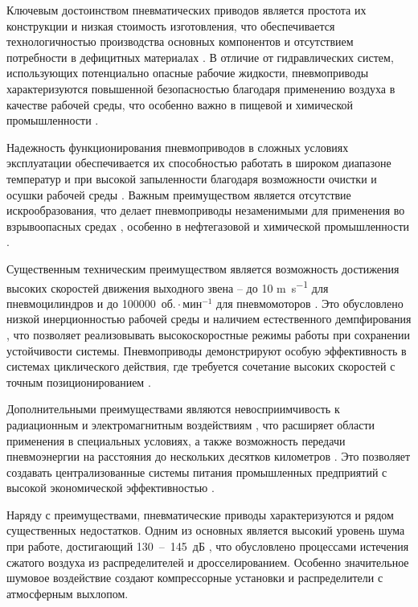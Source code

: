 Ключевым достоинством пневматических приводов является простота их конструкции и низкая
стоимость изготовления, что обеспечивается технологичностью производства основных компонентов
и отсутствием потребности в дефицитных материалах \cite{ritter2009nonlinear,dong2003prospects}. В отличие от гидравлических систем, использующих потенциально
опасные рабочие жидкости, пневмоприводы характеризуются повышенной безопасностью благодаря применению воздуха в качестве рабочей среды, что особенно важно в
пищевой и химической промышленности \cite{raisoni2017utilization,kreinin2020optimization}.

Надежность функционирования пневмоприводов в сложных условиях эксплуатации обеспечивается их способностью работать
в широком диапазоне температур и при высокой запыленности благодаря возможности очистки и осушки рабочей среды
\cite{perez2021reliable,lin2020selfsensing,robertson2017soft}. Важным преимуществом является отсутствие искрообразования,
что делает пневмоприводы незаменимыми для применения во взрывоопасных средах \cite{dong2003prospects,khitrovo2022jet},
особенно в нефтегазовой и химической промышленности \cite{li2008piezoelectric,zhao2017design}.

Существенным техническим преимуществом является возможность достижения высоких скоростей движения выходного
звена -- до 10 \si{\metre\per\second} для пневмоцилиндров и до \num{100000}~$\text{об.}\cdot\text{мин}^{-1}$ для пневмомоторов
\cite{tanaka2013comparative,wakana2013flexible}. Это обусловлено низкой инерционностью рабочей среды и наличием естественного
демпфирования \cite{volder2010review,yaoxing2013servo}, что позволяет реализовывать высокоскоростные режимы работы при сохранении
устойчивости системы. Пневмоприводы демонстрируют особую эффективность в системах циклического действия, где требуется сочетание
высоких скоростей с точным позиционированием \cite{mosadegh2014soft}.

Дополнительными преимуществами являются невосприимчивость к радиационным и электромагнитным
воздействиям \cite{kasimov:a,kasimov:b}, что расширяет области применения в специальных условиях,
а также возможность передачи пневмоэнергии на расстояния до нескольких десятков километров \cite{luo2011energy,wang2019isobaric}.
Это позволяет создавать централизованные системы питания промышленных предприятий с высокой экономической эффективностью \cite{bodh2016pneumatic,hassan2015booster}.

Наряду с преимуществами, пневматические приводы характеризуются и рядом существенных недостатков.
Одним из основных является высокий уровень шума при работе, достигающий 130~--~145~дБ \cite{pr11092544},
что обусловлено процессами истечения сжатого воздуха из распределителей и дросселированием.
Особенно значительное шумовое воздействие создают компрессорные установки и распределители с атмосферным выхлопом.

